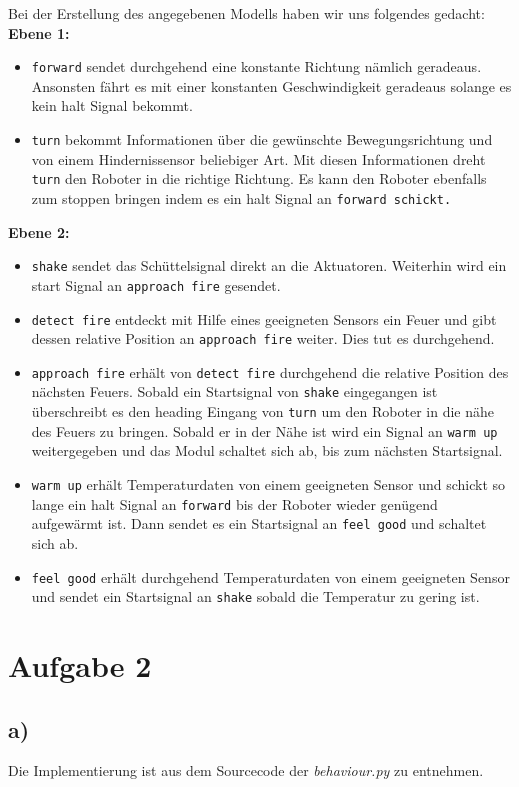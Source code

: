 \documentclass{../Vorlage/mat}
\begin{document}
Bei der Erstellung des angegebenen Modells haben wir uns folgendes gedacht:\\
\textbf{Ebene 1:}\\
\begin{itemize}
	\item \texttt{forward} sendet durchgehend eine konstante Richtung nämlich geradeaus. Ansonsten fährt es mit einer konstanten Geschwindigkeit geradeaus solange es kein halt Signal bekommt.
	\item \texttt{turn} bekommt Informationen über die gewünschte Bewegungsrichtung und von einem Hindernissensor beliebiger Art. Mit diesen Informationen dreht \texttt{turn} den Roboter in die richtige Richtung. Es kann den Roboter ebenfalls zum stoppen bringen indem es ein halt Signal an \texttt{forward schickt.}
\end{itemize}
\textbf{Ebene 2:}
\begin{itemize}
	\item \texttt{shake} sendet das Schüttelsignal direkt an die Aktuatoren. Weiterhin wird ein start Signal an \texttt{approach fire} gesendet.
	\item \texttt{detect fire} entdeckt mit Hilfe eines geeigneten Sensors ein Feuer und gibt dessen relative Position an \texttt{approach fire} weiter. Dies tut es durchgehend.
	\item \texttt{approach fire} erhält von \texttt{detect fire} durchgehend die relative Position des nächsten Feuers. Sobald ein Startsignal von \texttt{shake} eingegangen ist überschreibt es den heading Eingang von \texttt{turn} um den Roboter in die nähe des Feuers zu bringen. Sobald er in der Nähe ist wird ein Signal an \texttt{warm up} weitergegeben und das Modul schaltet sich ab, bis zum nächsten Startsignal.
	\item \texttt{warm up} erhält Temperaturdaten von einem geeigneten Sensor und schickt so lange ein halt Signal an \texttt{forward} bis der Roboter wieder genügend aufgewärmt ist. Dann sendet es ein Startsignal an \texttt{feel good} und schaltet sich ab.
	\item \texttt{feel good} erhält durchgehend Temperaturdaten von einem geeigneten Sensor und sendet ein Startsignal an \texttt{shake} sobald die Temperatur zu gering ist.
\end{itemize}


\section*{Aufgabe 2}
\subsection*{a)}
Die Implementierung ist aus dem Sourcecode der \textit{behaviour.py} zu entnehmen.
\end{document}
